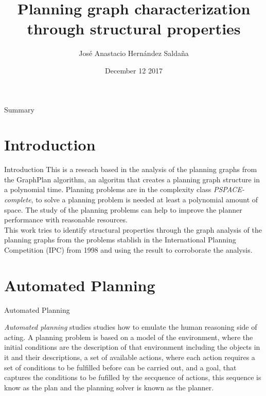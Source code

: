 \documentclass[handout,t]{beamer}
\title[Final Project]{Planning graph characterization through structural properties}
\date{December 12 2017}
\author{Jos\'e Anastacio Hern\'andez Saldaña}
\institute[PISIS-FIME-UANL] %
{
Facultad de Ingenier\'ia Mec\'anica y El\'ectrica\\ %
\medskip
\textit{jose.hernandezsld@uanl.edu.mx} %
}
\begin{document}

\frame{\titlepage}
\section[]{}
\begin{frame}{Summary}
  \tableofcontents
\end{frame}


\section{Introduction}
\begin{frame}{Introduction}
This is a reseach based in the analysis of the planning graphs from
the GraphPlan algorithm, an algoritm that creates a planning graph structure in a polynomial time. Planning problems are in the complexity class \textit{PSPACE-complete}, to solve a planning problem is needed at least a polynomial amount of space. The study of the planning problems can help to improve the planner performance with reasonable resources.
\\
This work tries to identify structural properties through the graph analysis of the planning graphs from the problems stablish in the International Planning Competition (IPC) from 1998 and using the result to corroborate the analysis.


\end{frame}

\section{Automated Planning}
\begin{frame}{Automated Planning}
  
  \textit{Automated planning} studies studies how to emulate the human
  reasoning side of acting. A planning problem is based on a model of
  the environment, where the initial conditions are the description of
  that environment including the objects in it and their descriptions,
  a set of available actions, where each action requires a set of
  conditions to be fulfilled before can be carried out, and a goal,
  that captures the conditions to be fufilled by the secquence of
  actions, this sequence is know as the plan and the planning solver
  is known as the planner.
  

\end{frame}
\end{document}
